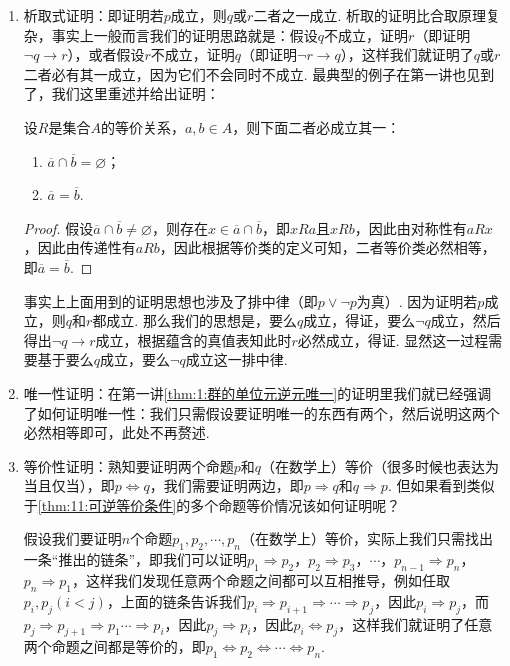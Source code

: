 \begin{enumerate}
    \item 析取式证明：即证明若$p$成立，则$q$或$r$二者之一成立. 析取的证明比合取原理复杂，事实上一般而言我们的证明思路就是：假设$q$不成立，证明$r$（即证明$\lnot q\to r$），或者假设$r$不成立，证明$q$（即证明$\lnot r\to q$），这样我们就证明了$q$或$r$二者必有其一成立，因为它们不会同时不成立. 最典型的例子在第一讲也见到了，我们这里重述并给出证明：
    \begin{theorem*}
        设$R$是集合$A$的等价关系，$a,b\in A$，则下面二者必成立其一：
        \begin{enumerate}
            \item $\overline{a}\cap\overline{b}=\varnothing$；
            \item $\overline{a}=\overline{b}$.
        \end{enumerate}
    \end{theorem*}
    \begin{proof}
        假设$\overline{a}\cap\overline{b}\neq\varnothing$，则存在$x\in\overline{a}\cap\overline{b}$，即$xRa$且$xRb$，因此由对称性有$aRx$，因此由传递性有$aRb$，因此根据等价类的定义可知，二者等价类必然相等，即$\overline{a}=\overline{b}$.
    \end{proof}

    事实上上面用到的证明思想也涉及了排中律（即$p\lor\lnot p$为真）. 因为证明若$p$成立，则$q$和$r$都成立. 那么我们的思想是，要么$q$成立，得证，要么$\lnot q$成立，然后得出$\lnot q\to r$成立，根据蕴含的真值表知此时$r$必然成立，得证. 显然这一过程需要基于要么$q$成立，要么$\lnot q$成立这一排中律.

    \item 唯一性证明：在第一讲\autoref{thm:1:群的单位元逆元唯一}的证明里我们就已经强调了如何证明唯一性：我们只需假设要证明唯一的东西有两个，然后说明这两个必然相等即可，此处不再赘述.

    \item 等价性证明：熟知要证明两个命题$p$和$q$（在数学上）等价（很多时候也表达为当且仅当），即$p\iff q$，我们需要证明两边，即$p\Rightarrow q$和$q\Rightarrow p$. 但如果看到类似于\autoref{thm:11:可逆等价条件}的多个命题等价情况该如何证明呢？

    假设我们要证明$n$个命题$p_1,p_2,\cdots,p_n$（在数学上）等价，实际上我们只需找出一条``推出的链条''，即我们可以证明$p_1\Rightarrow p_2$，$p_2\Rightarrow p_3$，$\cdots$，$p_{n-1}\Rightarrow p_n$，$p_n\Rightarrow p_1$，这样我们发现任意两个命题之间都可以互相推导，例如任取$p_i, p_j(i<j)$，上面的链条告诉我们$p_i\Rightarrow p_{i+1}\Rightarrow\cdots\Rightarrow p_j$，因此$p_i\Rightarrow p_j$，而$p_j\Rightarrow p_{j+1}\Rightarrow p_1\cdots\Rightarrow p_i$，因此$p_j\Rightarrow p_i$，因此$p_i\iff p_j$，这样我们就证明了任意两个命题之间都是等价的，即$p_1\iff p_2\iff\cdots\iff p_n$.


\end{enumerate}

